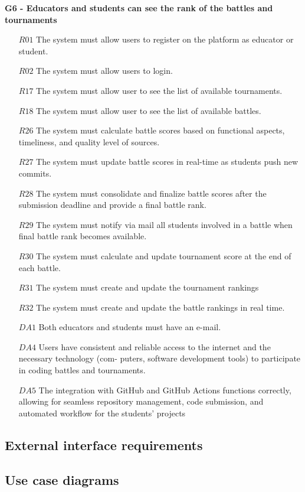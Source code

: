 \textbf{G6 - Educators and students can see the rank of the battles and tournaments}
\begin{itemize}
 \item [$R01$] The system must allow users to register on the platform as educator or student.
\item [$R02$]The system must allow users to login.
\item [$R17$]The system must allow user to see the list of available tournaments.
\item [$R18$]The system must allow user to see the list of available battles.
\item [$R26$]The system must calculate battle scores based on functional aspects, timeliness, and quality level
of sources.
\item [$R27$]The system must update  battle scores in real-time as students push new commits.
\item [$R28$]The system must consolidate and finalize battle scores after the submission deadline and provide
a final battle rank.
\item [$R29$]The system must notify via mail all students involved in a battle when final battle rank becomes
available.
\item [$R30$] The system must calculate and update tournament score at the end of each battle.
\item [$R31$] The system must create and update the tournament rankings
\item [$R32$]The system must create and update the battle rankings in real time.
\item [$DA1$]Both educators and students must have an e-mail.
\item [$DA4$]Users have consistent and reliable access to the internet and the necessary technology (com-
puters, software development tools) to participate in coding battles and tournaments.
\item [$DA5$] The integration with GitHub and GitHub Actions functions correctly, allowing for seamless
repository management, code submission, and automated workflow for the students’ projects
    
   
\end{itemize}


\subsection{External interface requirements}

\subsection{Use case diagrams}

